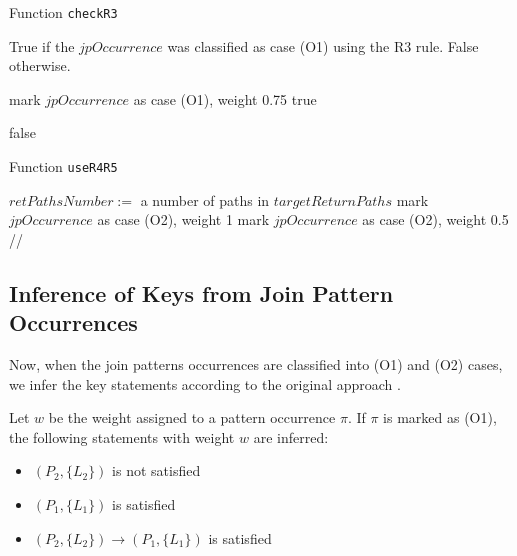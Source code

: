 \begin{algorithm}
\caption{Function \texttt{checkR3}}
\label{ALG_function_check_r3}
\begin{algorithmic}[1]

\ENSURE True if the $jpOccurrence$ was classified as case (O1) using the R3 rule. False otherwise.

        \STATE mark $jpOccurrence$ as case (O1), weight 0.75 
        \RETURN true
    \ENDIF
\ENDFOR

\RETURN false
\end{algorithmic}
\end{algorithm}

\begin{algorithm}
\caption{Function \texttt{useR4R5}}
\label{ALG_function_use_r4_r5}
\begin{algorithmic}[1]

\STATE $retPathsNumber :=$ a number of paths in $targetReturnPaths$
	\STATE mark $jpOccurrence$ as case (O2), weight 1 
\ELSE
	\STATE mark $jpOccurrence$ as case (O2), weight 0.5 // 
\ENDIF
\end{algorithmic}
\end{algorithm}

\subsection{Inference of Keys from Join Pattern Occurrences}
Now, when the join patterns occurrences are classified into (O1) and (O2) cases, we infer the key statements according to the original approach \cite{Necasky:2009:DXK:1529282.1529414}.


Let $w$ be the weight assigned to a pattern occurrence $\pi$. If $\pi$ is marked as (O1), the following statements with weight $w$ are inferred:
\begin{itemize}
\item $(P_2, \{L_2\})$ is not satisfied
\item $(P_1, \{L_1\})$ is satisfied
\item $(P_2, \{L_2\}) \rightarrow (P_1, \{L_1\})$ is satisfied
\end{itemize}

